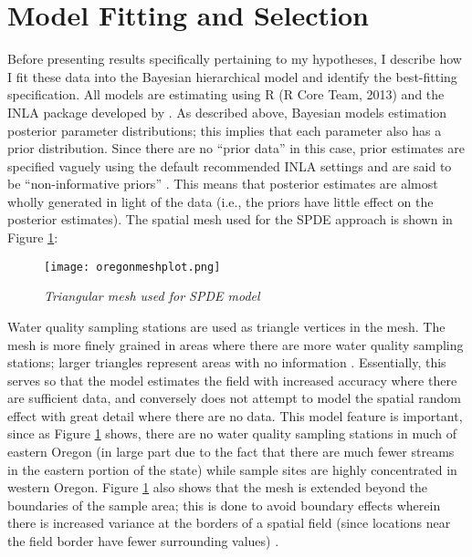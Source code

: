 \documentclass[11pt,a4paper,titlepage]{article}
\begin{document}
\section*{Model Fitting and Selection}

Before presenting results specifically pertaining to my hypotheses, I describe how I fit these data into the Bayesian hierarchical model and identify the best-fitting specification. All models are estimating using R (R Core Team, 2013) and the INLA package developed by \textcite{rue2009}. As described above, Bayesian models estimation posterior parameter distributions; this implies that each parameter also has a prior distribution. Since there are no “prior data” in this case, prior estimates are specified vaguely using the default recommended INLA settings \parencite{held2010} and are said to be “non-informative priors” \parencite{gelman2013}. This means that posterior estimates are almost wholly generated in light of the data (i.e., the priors have little effect on the posterior estimates). The spatial mesh used for the SPDE approach is shown in Figure \ref{fig:mesh}: 

\begin{figure}[!htbp]
\graphicspath{ {`/Users/TScott/Google\space Drive/quinalt/APPAM_2014/'}}
\label{fig:mesh}
\noindent
\texttt{[image: oregonmeshplot.png]}
\caption{\textit{Triangular mesh used for SPDE model}}
\end{figure}

Water quality sampling stations are used as triangle vertices in the mesh. The mesh is more finely grained in areas where there are more water quality sampling stations; larger triangles represent areas with no information \parencite{cosandey-godin2014}. Essentially, this serves so that the model estimates the field with increased accuracy where there are sufficient data, and conversely does not attempt to model the spatial random effect with great detail where there are no data. This model feature is important, since as Figure \ref{fig:mesh} shows, there are no water quality sampling stations in much of eastern Oregon (in large part due to the fact that there are much fewer streams in the eastern portion of the state) while sample sites are highly concentrated in western Oregon. Figure \ref{fig:mesh} also shows that the mesh is extended beyond the boundaries of the sample area; this is done to avoid boundary effects wherein there is increased variance at the borders of a spatial field (since locations near the field border have fewer surrounding values) \parencite{lindgren2013}.
\end{document}
